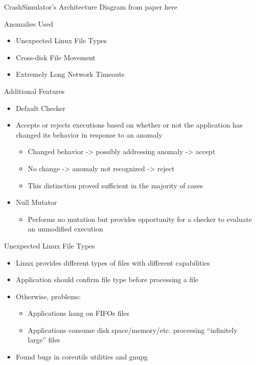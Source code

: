 \documentclass[pdf]{beamer}
\begin{document}
\begin{frame}{CrashSimulator's Architecture}
    Diagram from paper here
\end{frame}


\begin{frame}{Anomalies Used}
  \begin{itemize}
  \item{Unexpected Linux File Types}
  \item{Cross-disk File Movement}
  \item{Extremely Long Network Timeouts}
  \end{itemize}
\end{frame}


\begin{frame}{Additional Features}
  \begin{itemize}
  \item{Default Checker}
  \item{Accepts or rejects executions based on whether or not the
    application has changed its behavior in response to an anomaly}
      \begin{itemize}
      \item{Changed behavior -> possibly addressing anomaly -> accept}
      \item{No change -> anomaly not recognized -> reject}
      \item{This distinction proved sufficient in the majority of cases}
      \end{itemize}
  \item{Null Mutator}
  \begin{itemize}
  \item{Performs no mutation but provides opportunity for a checker to
    evaluate an unmodified execution}
  \end{itemize}
  \end{itemize}
\end{frame}


\begin{frame}{Unexpected Linux File Types}
  \begin{itemize}
  \item{Linux provides different types of files with different capabilities}
  \item{Application should confirm file type before processing a file}
  \item{Otherwise, problems:}
    \begin{itemize}
    \item{Applications hang on FIFOs files}
    \item{Applications consume disk space/memory/etc. processing ``infinitely
        large'' files}
    \end{itemize}
  \item{Found bugs in coreutils utilities and gnupg}
  \end{itemize}
\end{frame}
\end{document}
